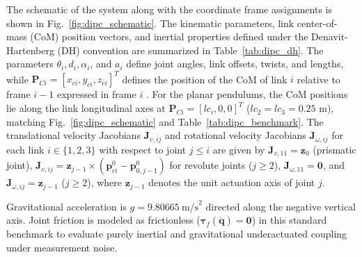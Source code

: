 \documentclass[lettersize,journal]{IEEEtran}
\begin{document}
\begin{table}[t]
\centering
\caption{Kinematic and Inertial Parameters for the 3-DOF Underactuated DIPC System}
\label{tab:dipc_dh}
\renewcommand{\arraystretch}{1.2}
\end{table}

The schematic of the system along with the coordinate frame assignments is shown in Fig.~\ref{fig:dipc_schematic}. The kinematic parameters, link center-of-mass (CoM) position vectors, and inertial properties defined under the Denavit-Hartenberg (DH) convention are summarized in Table~\ref{tab:dipc_dh}. The parameters $\theta_i, d_i, \alpha_i$, and $a_i$ define joint angles, link offsets, twists, and lengths, while $\bm{P}_{Ci} = [x_{ci}, y_{ci}, z_{ci}]^T$ defines the position of the CoM of link $i$ relative to frame $i-1$ expressed in frame $i$ \cite{Tsai.1999}. For the planar pendulums, the CoM positions lie along the link longitudinal axes at $\bm{P}_{Ci} = [lc_i, 0, 0]^T$ ($lc_2 = lc_3 = 0.25\text{ m}$), matching Fig.~\ref{fig:dipc_schematic} and Table~\ref{tab:dipc_benchmark}. The translational velocity Jacobians $\bm{J}_{v,ij}$ and rotational velocity Jacobians $\bm{J}_{\omega,ij}$ for each link $i \in \{1, 2, 3\}$ with respect to joint $j \le i$ are given by $\bm{J}_{v,11} = \bm{z}_0$ (prismatic joint), $\bm{J}_{v,ij} = \bm{z}_{j-1} \times (\bm{p}_{ci}^0 - \bm{p}_{0,j-1}^0)$ for revolute joints ($j \ge 2$), $\bm{J}_{\omega,11} = \mathbf{0}$, and $\bm{J}_{\omega,ij} = \bm{z}_{j-1}$ ($j \ge 2$), where $\bm{z}_{j-1}$ denotes the unit actuation axis of joint $j$.

Gravitational acceleration is $g = 9.80665~\text{m/s}^2$ directed along the negative vertical axis. Joint friction is modeled as frictionless ($\bm{\tau}_f(\dot{\bm{q}}) = \mathbf{0}$) in this standard benchmark to evaluate purely inertial and gravitational underactuated coupling under measurement noise.
\end{document}
